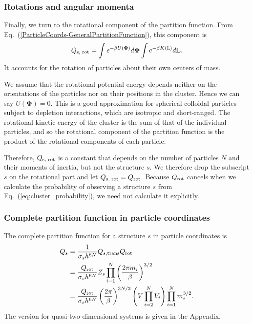 \documentclass[pre, aps, twocolumn, reprint, amsmath,amssymb, showpacs,
superscriptaddress] {revtex4-1}
\begin{document}
\subsubsection{Rotations and angular momenta}

Finally, we turn to the rotational component of the partition function.
From Eq.~(\ref{ParticleCoords-GeneralPartitionFunction}), this component
is
\begin{equation*}
	Q_\textnormal{s, rot}=\int{e^{- \beta U(\bm{\Phi}) } }d\bm{\Phi}
    \int{e^{- \beta K(\mathbb{L}) } }d\mathbb{L}.
\end{equation*}
It accounts for the rotation of particles about their own centers of
mass.

We assume that the rotational potential energy depends neither on the
orientations of the particles nor on their positions in the cluster.
Hence we can say $U(\bm{\Phi})=0$. This is a good approximation for
spherical colloidal particles subject to depletion interactions, which
are isotropic and short-ranged. The rotational kinetic energy of the
cluster is the sum of that of the individual particles, and so the
rotational component of the partition function is the product of the
rotational components of each particle.

Therefore, $Q_\textnormal{s, rot}$ is a constant that depends on the
number of particles $N$ and their moments of inertia, but not the
structure $s$. We therefore drop the subscript $s$ on the rotational
part and let $Q_\textnormal{s, rot} = Q_\textnormal{rot}$. Because
$Q_\textnormal{rot}$ cancels when we calculate the probability of
observing a structure $s$ from Eq.~(\ref{eq:cluster_probability}), we
need not calculate it explicitly.

\subsubsection{Complete partition function in particle coordinates}

The complete partition function for a structure $s$ in particle
coordinates is
\begin{equation}\label{Particle-CompletePartitionFunction}
	\begin{split}
		Q_s & = \frac{1}{\sigma_s h^{6N}} Q_{s, \textnormal{trans}} Q_{\textnormal{rot}} \\
    & = \frac{ Q_{\textnormal{rot}} }{\sigma_s h^{6N}} Z_{s} \prod_{i=1}^{N} \left({\frac{2 \pi m_i}{\beta}} \right)^{3/2} \\
    & = \frac{ Q_{\textnormal{rot}}}{\sigma_s h^{6N}} \left( \frac{2 \pi}{\beta} \right)^{3N/2}  \left( V\prod_{i=2}^N V_i  \right) \prod_{i=1}^{N} m_i^{3/2}.
  \end{split}
\end{equation}
The version for quasi-two-dimensional systems is given in the Appendix.
\end{document}
